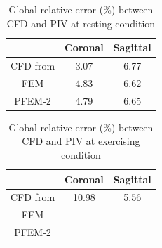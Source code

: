 \begin{table}[h]
\caption {Global relative error (\%) between CFD and PIV at resting condition} \label{tab:convergence}
\centering
\begin{tabular}{|c|c|c|}
\hline
       & Coronal & Sagittal \\ \hline
CFD from \cite{craven_cfd}  & 3.07    & 6.77     \\ \hline
FEM    & 4.83    & 6.62     \\ \hline
PFEM-2 & 4.79    & 6.65     \\ \hline
\end{tabular}
\end{table}

\begin{table}[h]
\caption {Global relative error (\%) between CFD and PIV at exercising condition} \label{tab:convergence}
\centering
\begin{tabular}{|c|c|c|}
\hline
       & Coronal & Sagittal \\ \hline
CFD from \cite{craven_cfd}  & 10.98	&5.56 \\ \hline
FEM    &      &    \\ \hline
PFEM-2 &     &       \\ \hline
\end{tabular}
\end{table}